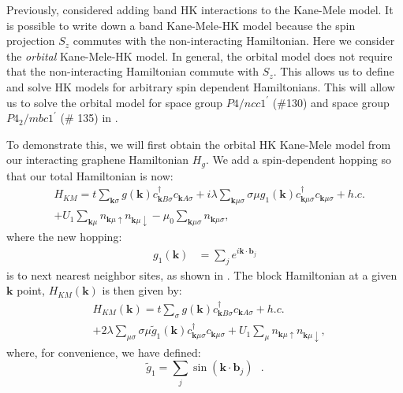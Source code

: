 \documentclass[prb,aps,amssymb,twocolumn,notitlepage]{revtex4-2}
\begin{document}
Previously, \cite{2022PhilipSpinHallHK} considered adding band HK interactions to the Kane-Mele model. 
It is possible to write down a band Kane-Mele-HK model because the spin projection $S_{z}$ commutes with the non-interacting Hamiltonian. 
Here we consider the \textit{orbital} Kane-Mele-HK model. 
In general, the orbital model does not require that the non-interacting Hamiltonian commute with $S_{z}$. 
This allows us to define and solve HK models for arbitrary spin dependent Hamiltonians. 
This will allow us to solve the orbital model for space group $P4/ncc1^\prime$ (\#130) and space group $P4_2/mbc1^\prime$ (\# 135) in .


 To demonstrate this, we will first obtain the orbital HK Kane-Mele model from our interacting graphene Hamiltonian $H_{g}$. 
We add a spin-dependent hopping so that our total Hamiltonian is now:
\begin{align}
&H_{KM}=t\sum_{\mathbf{k}\sigma}g(\mathbf{k})c^\dagger_{\mathbf{k}B\sigma}c_{\mathbf{k}A\sigma}+i\lambda\sum_{\mathbf{k}\mu\sigma}\sigma\mu g_{1}(\mathbf{k})c^\dagger_{\mathbf{k}\mu\sigma}c_{\mathbf{k}\mu\sigma}+h.c.\nonumber \\
&+U_{1}\sum_{\mathbf{k}\mu}n_{\mathbf{k}\mu\uparrow}n_{\mathbf{k}\mu\downarrow}-\mu_{0}\sum_{\mathbf{k}\mu\sigma}n_{\mathbf{k}\mu\sigma} ,
\end{align}
where the new hopping: 
\begin{align}
g_1(\mathbf{k})&=\sum_{j}e^{i\mathbf{k}\cdot\mathbf{b}_j}
\end{align}
is to next nearest neighbor sites, as shown in . 
The block Hamiltonian at a given $\mathbf{k}$ point, $H_{KM}(\mathbf{k})$ is then given by:
\begin{align}
    &H_{KM}(\mathbf{k})=t\sum_{\sigma}g(\mathbf{k})c^\dagger_{\mathbf{k}B\sigma}c_{\mathbf{k}A\sigma}+h.c.\\
    &+2\lambda\sum_{\mu\sigma}\sigma\mu\tilde{g}_{1} (\mathbf{k})c^\dagger_{\mathbf{k}\mu\sigma}c_{\mathbf{k}\mu\sigma}+U_{1}\sum_{\mu}n_{\mathbf{k}\mu\uparrow}n_{\mathbf{k}\mu\downarrow} ,\nonumber
\end{align}
where, for convenience, we have defined:
\begin{equation}
\tilde{g}_{1}=\sum_{j}\sin(\mathbf{k}\cdot\mathbf{b}_j)\text{ }.
\end{equation}
 
\end{document}
